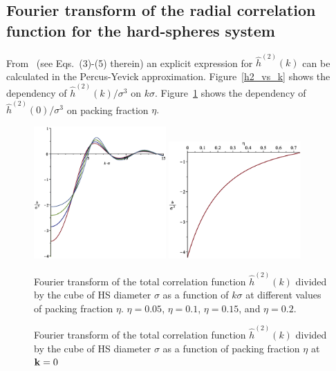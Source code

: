 \subsection{Fourier transform of the radial correlation function for the hard-spheres system}
From~\cite{Ashcroft1966} (see Eqs.~(3)-(5) therein) an explicit expression for $\hat{h}^{(2)}(k)$ can be calculated in the Percus-Yevick approximation.
Figure~\ref{h2_vs_k} shows the dependency of $\hat{h}^{(2)}(k)/\sigma^3$ on $k \sigma$. Figure~\ref{h2_vs_eta} shows the dependency of $\hat{h}^{(2)}(0)/\sigma^3$ on packing fraction $\eta.$
\begin{figure}[htbp]
	\includegraphics[width=0.45\textwidth,angle=0]{h2_as_function_of_k_at_different_eta} \hfill
	\includegraphics[width=0.45\textwidth,angle=0]{h2_as_function_of_eta_at_k_equals_0} \\
	\parbox{0.5\textwidth}{\caption{\label{h2_vs_k} Fourier transform of the total correlation function $\hat{h}^{(2)}(k)$ divided by the cube of HS diameter $\sigma$ as a function of $k\sigma$ at different values of packing fraction $\eta$. $\eta = 0.05$, $\eta=0.1$, $\eta = 0.15$, and $\eta=0.2$.
	}} \hfill
	\parbox{0.45\textwidth}{\caption{\label{h2_vs_eta} Fourier transform of the total correlation function $\hat{h}^{(2)}(k)$ divided by the cube of HS diameter $\sigma$ as a function of packing fraction $\eta$ at $\vb k = 0$
	}}
\end{figure}

